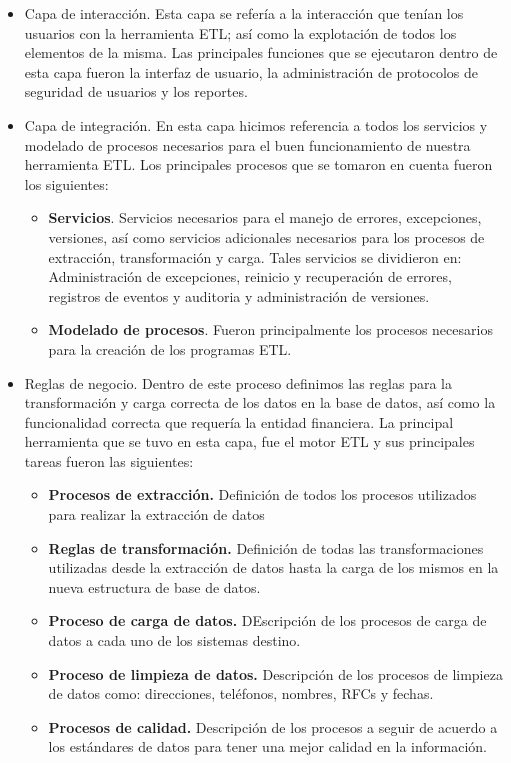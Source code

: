 \begin{itemize}

\item Capa de interacción. Esta capa se refería a la interacción que tenían
  los usuarios con la herramienta ETL; así como la explotación de todos los
  elementos de la misma. Las principales funciones que se ejecutaron dentro de
  esta capa fueron la interfaz de usuario, la administración de protocolos de
  seguridad de usuarios y los reportes.

\item Capa de integración. En esta capa hicimos referencia a todos los
  servicios y modelado de procesos necesarios para el buen funcionamiento de
  nuestra herramienta ETL. Los principales procesos que se tomaron en cuenta
  fueron los siguientes:

  \begin{itemize}
  \item \textbf{Servicios}. Servicios necesarios para el manejo de errores,
    excepciones, versiones, así como servicios adicionales necesarios para los
    procesos de extracción, transformación y carga. Tales servicios se
    dividieron en: Administración de excepciones, reinicio y recuperación de
    errores, registros de eventos y auditoria y administración de versiones.
  \item \textbf{Modelado de procesos}. Fueron principalmente los procesos
    necesarios para la creación de los programas ETL.
  \end{itemize}

\item Reglas de negocio. Dentro de este proceso definimos las reglas para la
  transformación y carga correcta de los datos en la base de datos, así como la
  funcionalidad correcta que requería la entidad financiera. La principal
  herramienta que se tuvo en esta capa, fue el motor ETL y sus principales
  tareas fueron las siguientes:

  \begin{itemize}
  \item \textbf{Procesos de extracción.} Definición de todos los procesos
    utilizados para realizar la extracción de datos
  \item \textbf{Reglas de transformación.} Definición de todas las
    transformaciones utilizadas desde la extracción de datos hasta la carga de
    los mismos en la nueva estructura de base de datos.
  \item \textbf{Proceso de carga de datos.} DEscripción de los procesos de carga
    de datos a cada uno de los sistemas destino.
  \item \textbf{Proceso de limpieza de datos.} Descripción de los procesos de
    limpieza de datos como: direcciones, teléfonos, nombres, RFCs y fechas.
  \item \textbf{Procesos de calidad.} Descripción de los procesos a seguir de
    acuerdo a los estándares de datos para tener una mejor calidad en la
    información.
  \end{itemize}

\end{itemize}

